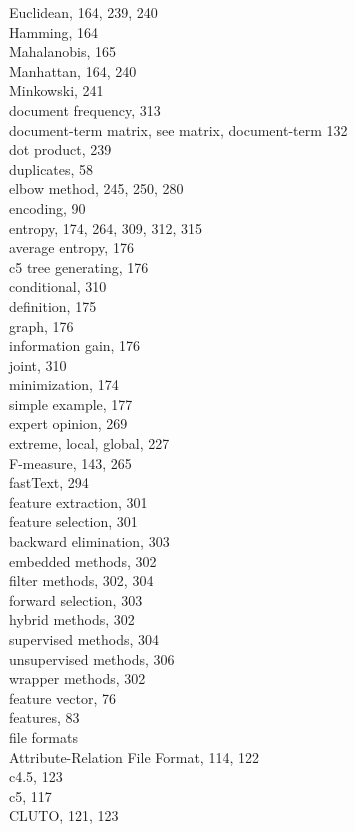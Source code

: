 \documentclass[10pt]{book}
\begin{document}
Euclidean, 164, 239, 240\\
Hamming, 164\\
Mahalanobis, 165\\
Manhattan, 164, 240\\
Minkowski, 241\\
document frequency, 313\\
document-term matrix, see matrix, document-term 132\\
dot product, 239\\
duplicates, 58\\
elbow method, 245, 250, 280\\
encoding, 90\\
entropy, 174, 264, 309, 312, 315\\
average entropy, 176\\
c5 tree generating, 176\\
conditional, 310\\
definition, 175\\
graph, 176\\
information gain, 176\\
joint, 310\\
minimization, 174\\
simple example, 177\\
expert opinion, 269\\
extreme, local, global, 227\\
F-measure, 143, 265\\
fastText, 294\\
feature extraction, 301\\
feature selection, 301\\
backward elimination, 303\\
embedded methods, 302\\
filter methods, 302, 304\\
forward selection, 303\\
hybrid methods, 302\\
supervised methods, 304\\
unsupervised methods, 306\\
wrapper methods, 302\\
feature vector, 76\\
features, 83\\
file formats\\
Attribute-Relation File Format, 114, 122\\
c4.5, 123\\
c5, 117\\
CLUTO, 121, 123\\
\end{document}

